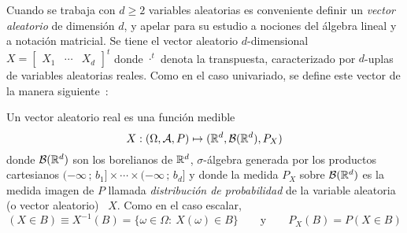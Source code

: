 Cuando se trabaja  con $d\geq 2$ variables aleatorias  es conveniente definir un
{\it vector aleatorio}  de dimensi\'on $d$, y apelar para  su estudio a nociones
del \'algebra  lineal y  a notaci\'on matricial.   Se tiene el  vector aleatorio
$d$-dimensional \ $X = \begin{bmatrix} X_1 & \cdots & X_d \end{bmatrix}^t$ donde
$\cdot^t$  denota  la  transpuesta,  caracterizado por  $d$-uplas  de  variables
aleatorias reales.   Como en  el caso  univariado, se define  este vector  de la
manera siguiente~\cite{AthLah06, Coh13, Bre88}:
%
\begin{definicion}
  Un vector aleatorio real es una funci\'on medible
  \[
  X: (\Omega,\mathcal{A},P) \mapsto (\mathbb{R}^d,\mathcal{B}(\mathbb{R}^d),P_X)
  \]
  donde  $\mathcal{B}(\mathbb{R}^d)$  son  los  borelianos  de  $\mathbb{R}^d$,  $\sigma$-\'algebra
  generada por  los productos cartesianos $(-\infty  \, ; \,  b_1] \times \cdots
  \times (-\infty \,  ; \, b_d]$ y donde la medida  $P_X$ sobre $\mathcal{B}(\mathbb{R}^d)$ es
  la medida  imagen de  $P$ llamada {\it  distribuci\'on de probabilidad}  de la
  variable aleatoria (o vector aleatorio) \ $X$. Como en el caso escalar,
 \[
 (X \in B) \equiv X^{-1}(B) = \{ \omega \in \Omega: \: X(\omega) \in B \} \qquad
 \mbox{y} \qquad P_X(B) = P(X \in B)
 \]
\end{definicion}
%
\noindent  {}

\

